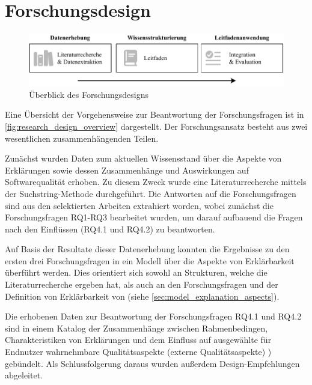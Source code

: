 \section{Forschungsdesign}
\begin{figure}[htb!]
    \begin{center}
        \includegraphics[width=\textwidth]{contents/03_research_design/res/research_design_overview.pdf}
    \end{center}
    \caption{Überblick des Forschungsdesigns}
    \label{fig:research_design_overview}
\end{figure}

Eine Übersicht der Vorgehensweise zur Beantwortung der Forschungsfragen ist in \autoref{fig:research_design_overview} dargestellt. Der Forschungsansatz besteht aus zwei wesentlichen zusammenhängenden Teilen.

Zunächst wurden Daten zum aktuellen Wissensstand über die Aspekte von Erklärungen sowie dessen Zusammenhänge und Auswirkungen auf Softwarequalität erhoben. Zu diesem Zweck wurde eine Literaturrecherche mittels der Suchstring-Methode \cite{kitchenham2004procedures} durchgeführt. Die Antworten auf die Forschungsfragen sind aus den selektierten Arbeiten extrahiert worden, wobei zunächst die Forschungsfragen RQ1-RQ3 bearbeitet wurden, um darauf aufbauend die Fragen nach den Einflüssen (RQ4.1 und RQ4.2) zu beantworten.

Auf Basis der Resultate dieser Datenerhebung konnten die Ergebnisse zu den ersten drei Forschungsfragen in ein Modell über die Aspekte von Erklärbarkeit überführt werden. Dies orientiert sich sowohl an Strukturen, welche die Literaturrecherche ergeben hat, als auch an den Forschungsfragen und der Definition von Erklärbarkeit von \citeauthor{chazette_knowledge_nodate} \cite{chazette_knowledge_nodate} (siehe \autoref{sec:model_explanation_aspects}).

Die erhobenen Daten zur Beantwortung der Forschungsfragen RQ4.1 und RQ4.2 sind in einem Katalog der Zusammenhänge zwischen Rahmenbedingen, Charakteristiken von Erklärungen und dem Einfluss auf ausgewählte für Endnutzer wahrnehmbare  Qualitätsaspekte (externe Qualitätsaspekte) ) gebündelt. Als Schlussfolgerung daraus wurden außerdem Design-Empfehlungen abgeleitet.

